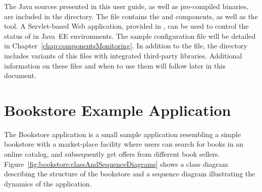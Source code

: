 \pagebreak

The Java sources presented in this user guide, as well as pre-compiled binaries, are included in the \file{\exampleDir/} directory. The file \file{\mainJar{}} contains the \KiekerMonitoringPart{} and \KiekerAnalysisPart{} components, as well as the \KiekerTraceAnalysis{} tool. A Servlet-based Web application, provided in \file{\servletWar}, can be used to control the status of \KiekerMonitoringPart{} in Java~EE environments. The sample \KiekerMonitoringPart{} 
configuration file %
\file{\kiekerMonitoringProperties{}} will be detailed in Chapter~\ref{chap:componentsMonitoring}. %
In addition to the \file{\mainJar{}} file, the  directory includes %
variants of this  files with integrated third-party libraries. Additional %
information on these  files and when to use them will follow later in this document. %


\section{Bookstore Example Application}\label{sec:example:bookstore}

The Bookstore application is a small sample application resembling a simple bookstore with a market-place facility where users can search for books in an online catalog, and subsequently get offers from different book sellers. 
Figure~\ref{fig:bookstore:classAndSequenceDiagrams} shows a class diagram describing the structure of the bookstore and a sequence diagram illustrating the dynamics of the application. 

